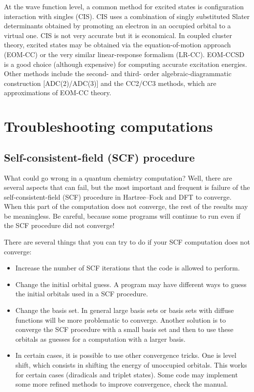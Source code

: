 \documentclass[../Main/chem532-notes.tex]{subfiles}
\begin{document}
At the wave function level, a common method for excited states is configuration interaction with singles (CIS). CIS uses a combination of singly substituted Slater determinants obtained by promoting an electron in an occupied orbital to a virtual one. CIS is not very accurate but it is economical.
In coupled cluster theory, excited states may be obtained via the equation-of-motion approach (EOM-CC) or the very similar linear-response formalism (LR-CC). EOM-CCSD is a good choice (although expensive) for computing accurate excitation energies.
Other methods include the second- and third- order algebraic-diagrammatic construction [ADC(2)/ADC(3)] and the CC2/CC3 methods, which are approximations of EOM-CC theory.


\section{Troubleshooting computations}
\subsection{Self-consistent-field (SCF) procedure}
What could go wrong in a quantum chemistry computation? Well, there are several aspects that can fail, but the most important and frequent is failure of the self-consistent-field (SCF) procedure in Hartree--Fock and DFT to converge. When this part of the computation does not converge, the rest of the results may be meaningless. Be careful, because some programs will continue to run even if the SCF procedure did not converge!

There are several things that you can try to do if your SCF computation does not converge:
\begin{itemize}
\item Increase the number of SCF iterations that the code is allowed to perform.
\item Change the initial orbital guess. A program may have different ways to guess the initial orbitals used in a SCF procedure.
\item Change the basis set. In general large basis sets or basis sets with diffuse functions will be more problematic to converge. Another solution is to converge the SCF procedure with a small basis set and then to use these orbitals as guesses for a computation with a larger basis.
\item In certain cases, it is possible to use other convergence tricks. One is level shift, which consists in shifting the energy of unoccupied orbitals. This works for certain cases (diradicals and triplet states).
Some code may implement some more refined methods to improve convergence, check the manual.
\end{itemize}
\end{document}
